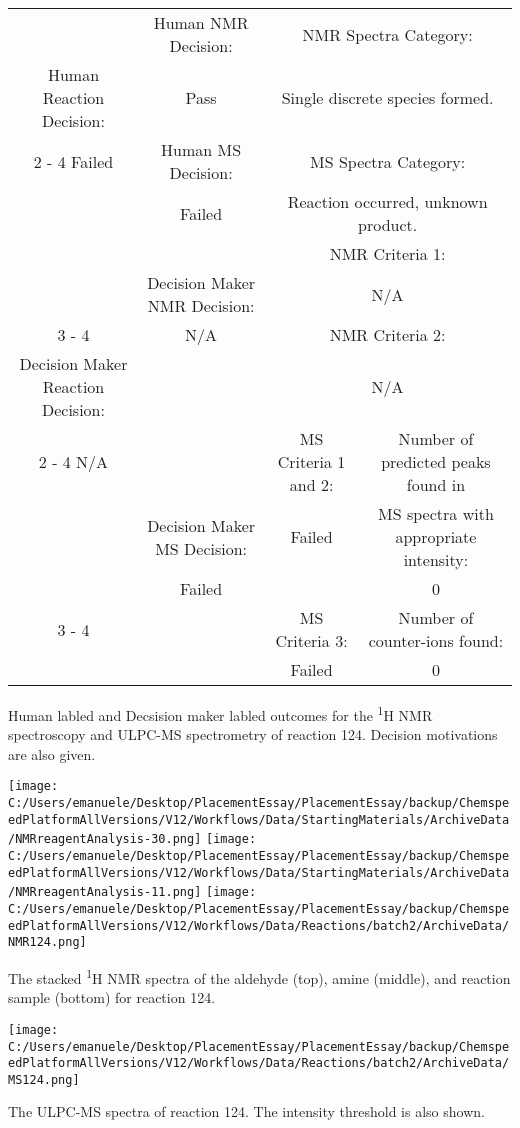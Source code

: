 \documentclass{article}%
\begin{document}
\begin{Decision Table}[H]%
\begin{tabular}{|c|c|c|c|}%
\hline%
&Human NMR Decision:&\multicolumn{2}{|c|}{NMR Spectra Category:}\\%
Human Reaction Decision:&Pass&\multicolumn{2}{|c|}{Single discrete species formed.}\\%
\cline{2%
-%
4}%
Failed&Human MS Decision:&\multicolumn{2}{|c|}{MS Spectra Category:}\\%
&Failed&\multicolumn{2}{|c|}{Reaction occurred, unknown product.}\\%
\hline%
&&\multicolumn{2}{|c|}{NMR Criteria 1:}\\%
&Decision Maker NMR Decision:&\multicolumn{2}{|c|}{N/A}\\%
\cline{3%
-%
4}%
&N/A&\multicolumn{2}{|c|}{NMR Criteria 2:}\\%
Decision Maker Reaction Decision:&&\multicolumn{2}{|c|}{N/A}\\%
\cline{2%
-%
4}%
N/A&&MS Criteria 1 and 2:&Number of predicted peaks found in\\%
&Decision Maker MS Decision:&Failed&MS spectra with appropriate intensity:\\%
&Failed&&0\\%
\cline{3%
-%
4}%
&&MS Criteria 3:&Number of counter{-}ions found:\\%
&&Failed&0\\%
\hline%
\end{tabular}%
\caption{Human labled and Decsision maker labled outcomes for the \textsuperscript{1}H NMR spectroscopy and ULPC-MS spectrometry of reaction 124. Decision motivations are also given.}%
\end{Decision Table}%
\begin{NMR Spectra}[H]%
\begin{center}%
\texttt{[image: C:/Users/emanuele/Desktop/PlacementEssay/PlacementEssay/backup/ChemspeedPlatformAllVersions/V12/Workflows/Data/StartingMaterials/ArchiveData/NMRreagentAnalysis-30.png]}\hfill%
\texttt{[image: C:/Users/emanuele/Desktop/PlacementEssay/PlacementEssay/backup/ChemspeedPlatformAllVersions/V12/Workflows/Data/StartingMaterials/ArchiveData/NMRreagentAnalysis-11.png]}\hfill%
\texttt{[image: C:/Users/emanuele/Desktop/PlacementEssay/PlacementEssay/backup/ChemspeedPlatformAllVersions/V12/Workflows/Data/Reactions/batch2/ArchiveData/NMR124.png]}\hfill%
\end{center}%
\caption{The stacked \textsuperscript{1}H NMR spectra of the aldehyde (top), amine (middle), and reaction sample (bottom) for reaction 124.}%
\end{NMR Spectra}%
\begin{MS Spectra}[H]%
\begin{center}%
\texttt{[image: C:/Users/emanuele/Desktop/PlacementEssay/PlacementEssay/backup/ChemspeedPlatformAllVersions/V12/Workflows/Data/Reactions/batch2/ArchiveData/MS124.png]}\hfill%
\end{center}%
\caption{The ULPC-MS spectra of reaction 124. The intensity threshold is also shown.}%
\end{MS Spectra}%
\end{document}
